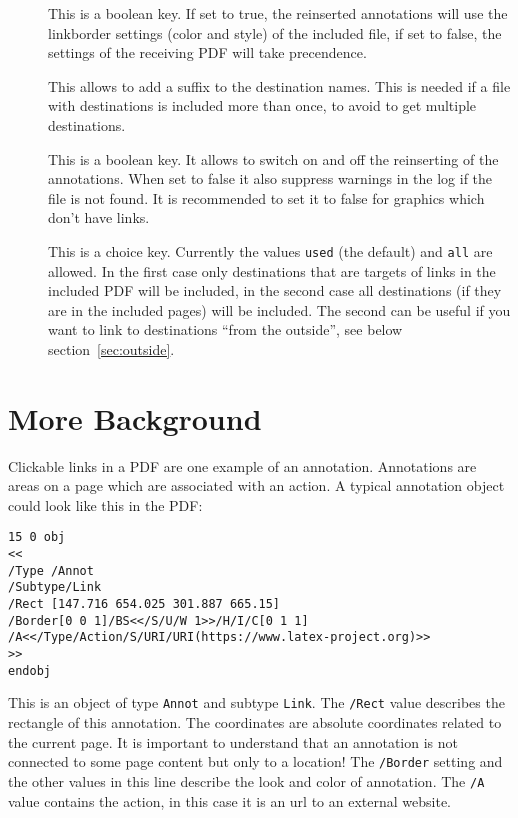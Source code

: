 \documentclass[DIV=12,parskip=half-,bibliography=totoc]{scrartcl}
\begin{document}
\begin{description}
  \item[] This is a boolean key. If set to true, the reinserted annotations will use the linkborder settings (color and style) of the included file, if set to false, the settings of the receiving PDF will take precendence.

  \item[] This allows to add a suffix to the destination names. This is needed if a file with destinations
  is included more than once, to avoid to get multiple destinations.

 \item[] This is a boolean key. It allows to switch on and off the reinserting of the annotations. When set to false  it also suppress warnings in the log if the  file is not found.
     It is recommended to set it to false for graphics which don't have links.

 \item[] This is a choice key. Currently the values 
     \texttt{used} (the default) and \texttt{all} are allowed. In the first 
     case only destinations that are targets of links in the included PDF 
     will be included, in the second case all destinations (if they are in 
     the included pages) will be included. The second can be useful if you 
     want to link to destinations \enquote{from the outside}, see below 
     section~\ref{sec:outside}.  
\end{description}


\section{More Background}

Clickable links in a PDF are one example of an annotation. Annotations are areas on a page which are associated with an action. A typical annotation object could look like this in the PDF:

\begin{lstlisting}
15 0 obj
<<
/Type /Annot
/Subtype/Link
/Rect [147.716 654.025 301.887 665.15]
/Border[0 0 1]/BS<</S/U/W 1>>/H/I/C[0 1 1]
/A<</Type/Action/S/URI/URI(https://www.latex-project.org)>>
>>
endobj
\end{lstlisting}
This is an object of type \texttt{Annot} and subtype \texttt{Link}.
The \texttt{/Rect} value describes the rectangle of this annotation. The coordinates are absolute coordinates related to the current page. It is important to understand that an annotation is not connected to some page content but only to a location!
The \texttt{/Border} setting and the other values in this line describe the look and color of annotation. The \texttt{/A} value contains the action, in this case it is an url to an external website.
\end{document}
